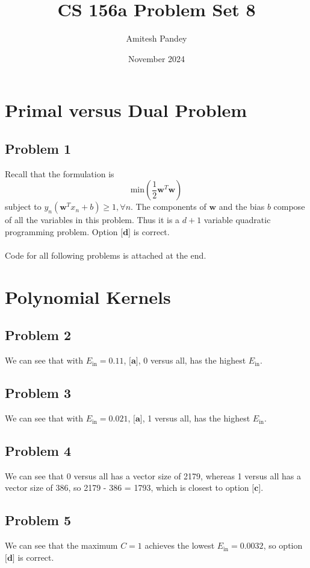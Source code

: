 \documentclass{article}
\title{CS 156a Problem Set 8}
\author{Amitesh Pandey}
\date{November 2024}
\begin{document}
\maketitle
\section*{Primal versus Dual Problem}
\subsection*{Problem 1}
Recall that the formulation is
\begin{equation*}
    \text{min} \left(\frac{1}{2}\mathbf{w}^{T}\mathbf{w}\right)
\end{equation*}
subject to $y_{n}(\mathbf{w}^{T}x_{n} + b) \geq 1,  \forall n$. The components of $\mathbf{w}$ and the bias $b$ compose of all the variables in this problem. Thus it is a $d + 1$ variable quadratic programming problem. Option $\textbf{[d]}$ is correct.\\\\
 Code for all following problems is attached at the end.
\section*{Polynomial Kernels}
\subsection*{Problem 2}
We can see that with $E_{\text{in}} = 0.11$, $\textbf{[a]}$, 0 versus all, has the highest $E_{\text{in}}$. 
\subsection*{Problem 3}
We can see that with $E_{\text{in}} = 0.021$, $\textbf{[a]}$, 1 versus all, has the highest $E_{\text{in}}$. 
\subsection*{Problem 4}
We can see that 0 versus all has a vector size of 2179, whereas 1 versus all has a vector size of 386, so 2179 - 386 = 1793, which is closest to option $\textbf{[c]}$.
\subsection*{Problem 5}
We can see that the maximum $C = 1$ achieves the lowest $E_{\text{in}} = 0.0032$, so option $\textbf{[d]}$ is correct.
\end{document}
